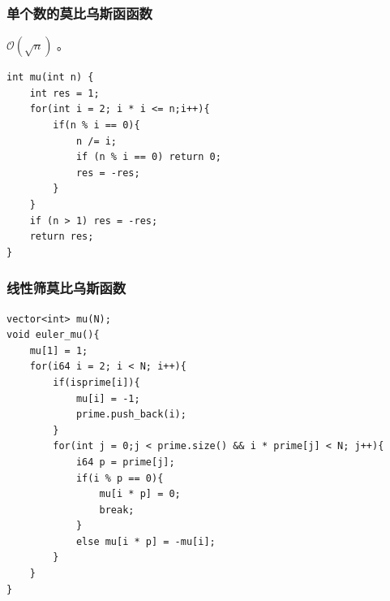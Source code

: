 \subsubsection{单个数的莫比乌斯函函数}
 $\mathcal{O}(\sqrt{n})$ 。
\begin{lstlisting}[caption={}]
int mu(int n) {
    int res = 1;
    for(int i = 2; i * i <= n;i++){
        if(n % i == 0){
            n /= i;
            if (n % i == 0) return 0;
            res = -res;
        }
    }
    if (n > 1) res = -res;
    return res;
}
\end{lstlisting}

\subsubsection{线性筛莫比乌斯函数}
\begin{lstlisting}[caption={}]
vector<int> mu(N);
void euler_mu(){
    mu[1] = 1;
    for(i64 i = 2; i < N; i++){
        if(isprime[i]){
            mu[i] = -1;
            prime.push_back(i);
        }
        for(int j = 0;j < prime.size() && i * prime[j] < N; j++){
            i64 p = prime[j];
            if(i % p == 0){
                mu[i * p] = 0;
                break;
            }
            else mu[i * p] = -mu[i];
        }
    }
}
\end{lstlisting}

